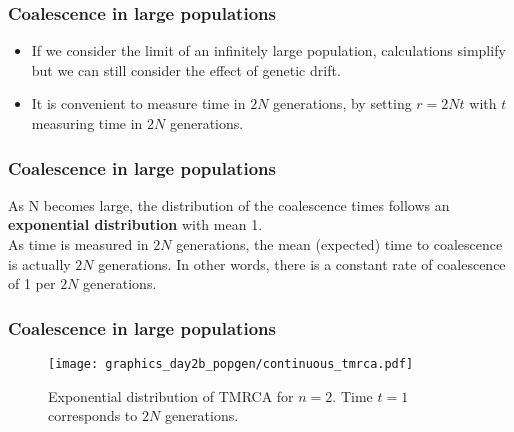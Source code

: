 \documentclass{beamer}
\newcommand{\1}{\ensuremath{\mathbf{1}}}
\begin{document}
%
%
%
\begin{frame}\frametitle{Coalescence in large populations}
	\begin{itemize}
		\item If we consider the limit of an infinitely large population, calculations simplify but we can still consider the effect of genetic drift.
		\item It is convenient to measure time in $2N$ generations, by setting $r = 2Nt$ with $t$ measuring time in $2N$ generations.
	\end{itemize}
\end{frame}
%
%
%
\begin{frame}\frametitle{Coalescence in large populations}
	As N becomes large, the distribution of the coalescence times follows an \textbf{exponential distribution} with mean 1.\\[2ex]
	As time is measured in $2N$ generations, the mean (expected) time to coalescence is actually $2N$ generations. In other words, there is a constant rate of coalescence of 1 per $2N$ generations.
\end{frame}
%
%
%
\begin{frame}\frametitle{Coalescence in large populations}
	\begin{figure}
	\begin{center}
		\texttt{[image: graphics\_day2b\_popgen/continuous\_tmrca.pdf]}
	\end{center}
	\caption{Exponential distribution of TMRCA for $n=2$. Time $t=1$ corresponds to $2N$ generations.}
	\end{figure}
\end{frame}
\end{document}
